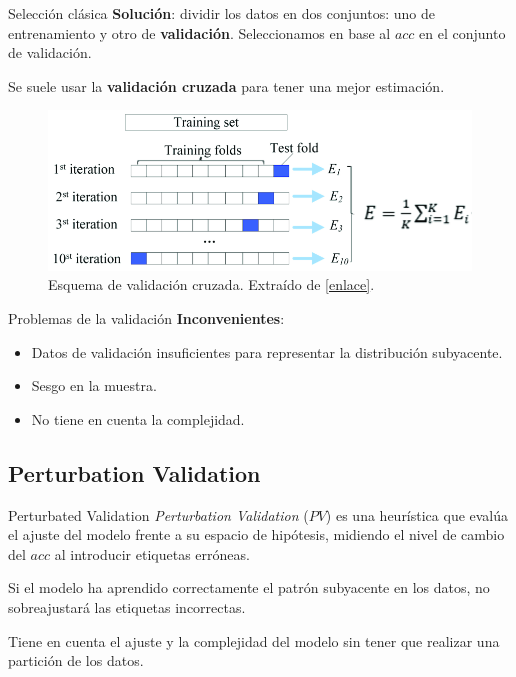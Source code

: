 \documentclass[spanish]{beamer}
\begin{document}
\begin{frame}{Selección clásica}
  \textbf{Solución}: dividir los datos en dos conjuntos: uno de entrenamiento y otro de \textbf{validación}. Seleccionamos en base al $acc$ en el conjunto de validación.

  \pause

  Se suele usar la \textbf{validación cruzada} para tener una mejor estimación.

  \begin{figure}
    \centering
    \includegraphics[width=.8 \textwidth]{img/cv}
    \caption{Esquema de validación cruzada. Extraído de \href{https://www.semanticscholar.org/paper/RFAmyloid\%3A-A-Web-Server-for-Predicting-Amyloid-Niu-Li/bf91ead8b0d49922dab952aa7f96e1480578289c/figure/6}{[enlace]}.}
  \end{figure}
\end{frame}

\begin{frame}{Problemas de la validación}
  \textbf{Inconvenientes}:
  \begin{itemize}
    \item Datos de validación insuficientes para representar la distribución subyacente.
    \item Sesgo en la muestra.
    \item No tiene en cuenta la complejidad.
  \end{itemize}
\end{frame}

\subsection{Perturbation Validation}

\begin{frame}{Perturbated Validation}
  \emph{Perturbation Validation} ($PV$) es una heurística que evalúa el ajuste del modelo frente a su espacio de hipótesis, midiendo el nivel de cambio del $acc$ al introducir etiquetas erróneas.

  \pause

  Si el modelo ha aprendido correctamente el patrón subyacente en los datos, no sobreajustará las etiquetas incorrectas.

  \pause

  Tiene en cuenta el ajuste y la complejidad del modelo sin tener que realizar una partición de los datos.
\end{frame}
\end{document}
